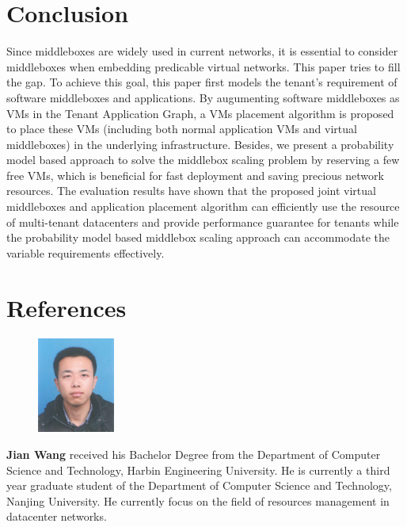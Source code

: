 \documentclass[review]{elsarticle}
\begin{document}
\section{Conclusion}\label{sec:final}
Since middleboxes are widely used in current networks, it is essential to consider middleboxes when embedding predicable virtual networks. This paper tries to fill the gap. To achieve this goal, this paper first models the tenant's requirement of software middleboxes and applications. By augumenting software middleboxes as VMs in the Tenant Application Graph, a VMs placement algorithm %
is proposed to place these VMs (including both normal application VMs and virtual middleboxes) in the underlying infrastructure. 
Besides, we present a probability model based approach to solve the middlebox scaling problem by reserving a few free VMs, which is beneficial for fast deployment and saving precious network resources.
The evaluation results have shown that the proposed joint virtual middleboxes and application placement algorithm can efficiently use the resource of multi-tenant datacenters and provide performance guarantee for tenants while the probability model based middlebox scaling approach can accommodate the variable requirements effectively.   

 






%

\section*{References}



\newpage

\begin{figure}
	\includegraphics[width=1.0in]{wangjian.png}
\end{figure} 
\textbf{Jian Wang} received his Bachelor Degree from the Department of Computer Science and Technology, Harbin Engineering University. He is currently a third year graduate student of the Department of Computer Science and Technology, Nanjing University.
He currently focus on the field of resources management in datacenter networks.
\end{document}

